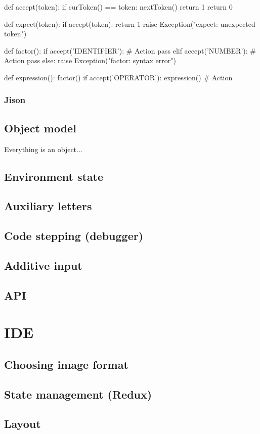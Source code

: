 \begin{code}
def accept(token):
    if curToken() == token:
        nextToken()
        return 1
    return 0

def expect(token):
    if accept(token):
        return 1
    raise Exception("expect: unexpected token")

def factor():
    if accept('IDENTIFIER'):
        # Action
        pass
    elif accept('NUMBER'):
        # Action
        pass 
    else:
        raise Exception("factor: syntax error")

def expression():
    factor()
    if accept('OPERATOR'):
        expression()
        # Action
\end{code}
\subsubsection*{Jison}

\subsection{Object model}
Everything is an object...

\subsection{Environment state}

\subsection{Auxiliary letters}

\subsection{Code stepping (debugger)}

\subsection{Additive input}

\subsection{API}

\section{IDE}

\subsection{Choosing image format}

\subsection{State management (Redux)}

\subsection{Layout}